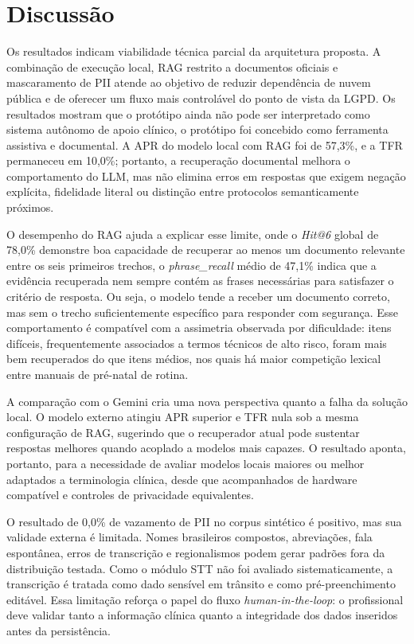 \documentclass[12pt]{article}
\begin{document}
\section{Discussão}
Os resultados indicam viabilidade técnica parcial da arquitetura proposta.
A combinação de execução local, RAG restrito a documentos oficiais e mascaramento de PII atende ao objetivo de reduzir dependência de nuvem pública e de oferecer um fluxo mais controlável do ponto de vista da LGPD.
Os resultados mostram que o protótipo ainda não pode ser interpretado como sistema autônomo de apoio clínico, o protótipo foi concebido como ferramenta assistiva e documental.
A APR do modelo local com RAG foi de 57,3\%, e a TFR permaneceu em 10,0\%; portanto, a recuperação documental melhora o comportamento do LLM, mas não elimina erros em respostas que exigem negação explícita, fidelidade literal ou distinção entre protocolos semanticamente próximos.

O desempenho do RAG ajuda a explicar esse limite, onde o \textit{Hit@6} global de 78,0\% demonstre boa capacidade de recuperar ao menos um documento relevante entre os seis primeiros trechos, o \textit{phrase\_recall} médio de 47,1\% indica que a evidência recuperada nem sempre contém as frases necessárias para satisfazer o critério de resposta.
Ou seja, o modelo tende a receber um documento correto, mas sem o trecho suficientemente específico para responder com segurança.
Esse comportamento é compatível com a assimetria observada por dificuldade: itens difíceis, frequentemente associados a termos técnicos de alto risco, foram mais bem recuperados do que itens médios, nos quais há maior competição lexical entre manuais de pré-natal de rotina.

A comparação com o Gemini cria uma nova perspectiva quanto a falha da solução local.
O modelo externo atingiu APR superior e TFR nula sob a mesma configuração de RAG, sugerindo que o recuperador atual pode sustentar respostas melhores quando acoplado a modelos mais capazes.
O resultado aponta, portanto, para a necessidade de avaliar modelos locais maiores ou melhor adaptados a terminologia clínica, desde que acompanhados de hardware compatível e controles de privacidade equivalentes.

O resultado de 0,0\% de vazamento de PII no corpus sintético é positivo, mas sua validade externa é limitada. Nomes brasileiros compostos, abreviações, fala espontânea, erros de transcrição e regionalismos podem gerar padrões fora da distribuição testada. Como o módulo STT não foi avaliado sistematicamente, a transcrição é tratada como dado sensível em trânsito e como pré-preenchimento editável. Essa limitação reforça o papel do fluxo \textit{human-in-the-loop}: o profissional deve validar tanto a informação clínica quanto a integridade dos dados inseridos antes da persistência.
\end{document}

